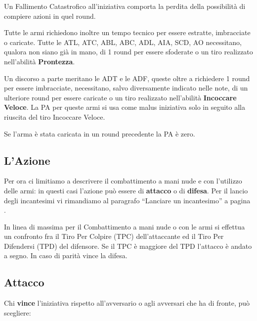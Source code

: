 Un Fallimento Catastrofico all'iniziativa comporta la perdita della
possibilit\`a di compiere azioni in quel round.

Tutte le armi richiedono inoltre un tempo tecnico per essere estratte,
imbracciate o caricate. Tutte le ATL, ATC, ABL, ABC, ADL, AIA, SCD, AO
necessitano, qualora non siano gi\`a in mano, di 1 round per essere
sfoderate o un tiro realizzato nell'abilit\`a \textbf{Prontezza}.

Un discorso a parte meritano le ADT e le ADF, queste oltre a
richiedere 1 round per essere imbracciate, necessitano, salvo
diversamente indicato nelle note, di un ulteriore round per essere
caricate o un tiro realizzato nell'abilit\`a \textbf{Incoccare Veloce}. La PA
per queste armi si usa come malus iniziativa solo in seguito alla
riuscita del tiro Incoccare Veloce.

Se l'arma \`e stata caricata in un round precedente la PA \`e
zero.


\subsection{L'Azione} 

Per ora ci limitiamo a descrivere il combattimento a mani nude e con
l'utilizzo delle armi: in questi casi l'azione pu\`o essere di
\textbf{attacco} o di \textbf{difesa}. Per il lancio degli incantesimi
vi rimandiamo al paragrafo ``Lanciare un incantesimo'' a pagina
\pageref{lanciareincantesimo}.

In linea di massima per il Combattimento a mani nude o con le armi si
effettua un confronto fra il Tiro Per Colpire (TPC) dell'attaccante ed
il Tiro Per Difendersi (TPD) del difensore. Se il TPC \`e maggiore
del TPD l'attacco \`e andato a segno.  In caso di parit\`a vince
la difesa.
  

\subsection{Attacco} 

Chi \textbf{vince} l'iniziativa rispetto all'avversario o agli
avversari che ha di fronte, pu\`o scegliere:

